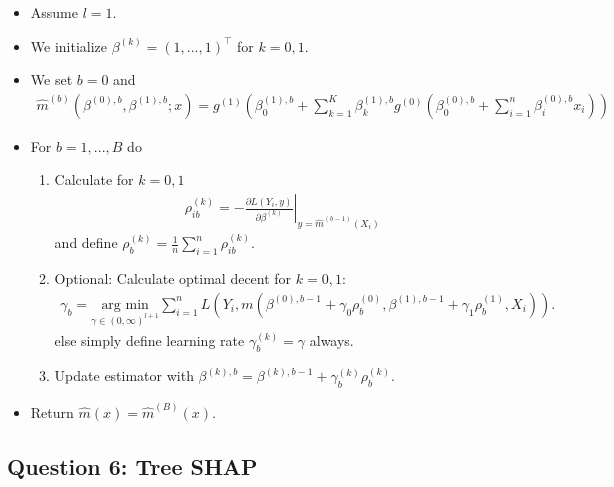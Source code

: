 \documentclass[
]{book}
\providecommand{\tightlist}{%
  \setlength{\itemsep}{0pt}\setlength{\parskip}{0pt}}
\begin{document}
\begin{itemize}
\tightlist
\item
  Assume \(l=1\).
\item
  We initialize \(\beta^{(k)}=(1,...,1)^\top\) for \(k=0,1\).
\item
  We set \(b=0\) and
  \begin{align*}
    \hat m^{(b)}(\beta^{(0),b},\beta^{(1),b};x)=g^{(1)}\left(\beta^{(1),b}_0 + \sum_{k=1}^{K}\beta_k^{(1),b}g^{(0)}\left(\beta^{(0),b}_0+\sum_{i=1}^n\beta^{(0),b}_ix_i\right)\right)
    \end{align*}
\item
  For \(b=1,...,B\) do

  \begin{enumerate}
  \def\labelenumi{(\alph{enumi})}
  \tightlist
  \item
    Calculate for \(k=0,1\)
    \begin{align*}
    \rho_{ib}^{(k)}=-\left.\frac{\partial L(Y_i,y)}{\partial \beta^{(k)}}\right\vert_{y=\hat m^{(b-1)}(X_i)}
    \end{align*}
    and define
    \(\rho_{b}^{(k)}=\frac{1}{n}\sum_{i=1}^n\rho_{ib}^{(k)}\).
  \item
    Optional: Calculate optimal decent for \(k=0,1\):
    \begin{align*}
    \gamma_{b}=\underset{\gamma \in (0,\infty)^{l+1}}{\text{arg min}}\sum_{i=1}^n L(Y_i,m(\beta^{(0),b-1}+\gamma_0\rho_b^{(0)},\beta^{(1),b-1}+\gamma_1\rho_b^{(1)},X_i)).
    \end{align*}
    else simply define learning rate \(\gamma_b^{(k)}=\gamma\) always.
  \item
    Update estimator with \(\beta^{(k),b}=\beta^{(k),b-1}+\gamma_{b}^{(k)}\rho_b^{(k)}\).
  \end{enumerate}
\item
  Return \(\hat m(x)=\hat m^{(B)}(x)\).
\end{itemize}

\hypertarget{question-6-tree-shap}{%
\subsection{Question 6: Tree SHAP}\label{question-6-tree-shap}}

  
\end{document}
